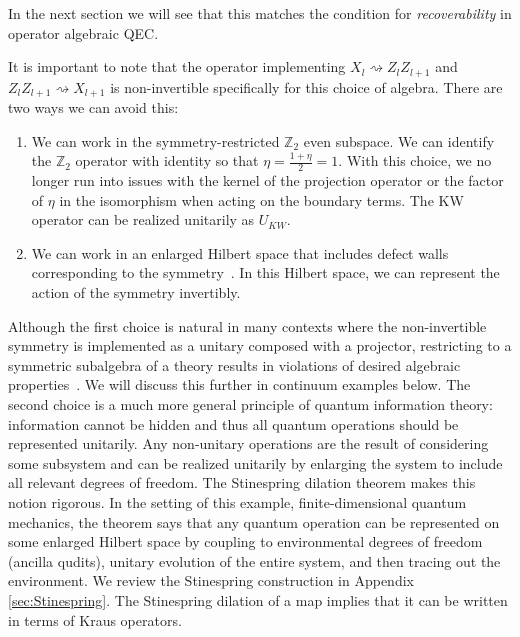 \documentclass{article}
\theoremstyle{definition}
\begin{document}
  In the next section we will see that this matches the condition for \textit{recoverability}
  in operator algebraic QEC.


  It is important to note that the operator implementing
  $X_{l}\rightsquigarrow Z_{l}Z_{l+1}$ and
  $Z_{l}Z_{l+1}\rightsquigarrow X_{l+1}$ is non-invertible specifically for this
  choice of algebra. There are two ways we can avoid this:

  \begin{enumerate}
    \item We can work in the symmetry-restricted $\mathbb{Z}_{2}$ even subspace.
      We can identify the $\mathbb{Z}_{2}$ operator with identity so that
      $\eta = \frac{1+\eta}{2}= 1$. With this choice, we no longer run into
      issues with the kernel of the projection operator or the factor of $\eta$
      in the isomorphism when acting on the boundary terms. The KW operator can be
      realized unitarily as $U_{KW}$.

    \item We can work in an enlarged Hilbert space that includes defect walls corresponding
      to the symmetry~\cite{tachikawa2024noninvertiblysymmetryquantumoperations}.
      In this Hilbert space, we can represent the action of the symmetry invertibly.
  \end{enumerate}

  Although the first choice is natural in many contexts where the non-invertible
  symmetry is implemented as a unitary composed with a projector, restricting to
  a symmetric subalgebra of a theory results in violations of desired algebraic properties~\cite{haag2012local}.
  We will discuss this further in continuum examples below. The second choice is
  a much more general principle of quantum information theory: information cannot
  be hidden and thus all quantum operations should be represented unitarily. Any
  non-unitary operations are the result of considering some subsystem and can be
  realized unitarily by enlarging the system to include all relevant degrees of
  freedom. The Stinespring dilation theorem makes this notion rigorous. In the
  setting of this example, finite-dimensional quantum mechanics, the theorem
  says that any quantum operation can be represented on some enlarged Hilbert
  space by coupling to environmental degrees of freedom (ancilla qudits), unitary
  evolution of the entire system, and then tracing out the environment. We review
  the Stinespring construction in Appendix \ref{sec:Stinespring}.  The Stinespring dilation of a map implies that it can be written in terms of Kraus operators.
\end{document}
